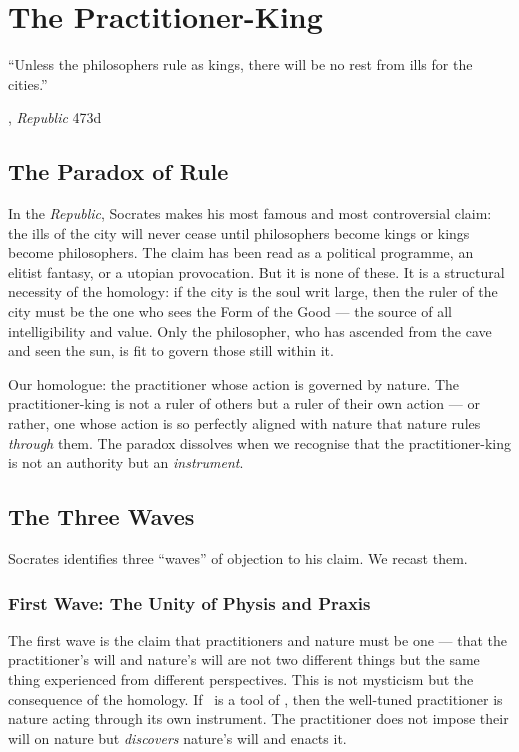 \chapter{The Practitioner-King}

\epigraph{``Unless the philosophers rule as kings, there will be no rest from ills
for the cities.''}{\textcite{plato1997complete}, \emph{Republic} 473d}

\section{The Paradox of Rule}

In the \emph{Republic}, Socrates makes his most famous and most controversial
claim: the ills of the city will never cease until philosophers become kings or
kings become philosophers. The claim has been read as a political programme, an
elitist fantasy, or a utopian provocation. But it is none of these. It is a
structural necessity of the homology: if the city is the soul writ large, then
the ruler of the city must be the one who sees the Form of the Good --- the
source of all intelligibility and value. Only the philosopher, who has ascended
from the cave and seen the sun, is fit to govern those still within it.

Our homologue: the practitioner whose action is governed by nature. The
practitioner-king is not a ruler of others but a ruler of their own action ---
or rather, one whose action is so perfectly aligned with nature that nature rules
\emph{through} them. The paradox dissolves when we recognise that the
practitioner-king is not an authority but an \emph{instrument}.

\section{The Three Waves}

Socrates identifies three ``waves'' of objection to his claim. We recast them.

\subsection{First Wave: The Unity of Physis and Praxis}

The first wave is the claim that practitioners and nature must be one --- that
the practitioner's will and nature's will are not two different things but the
same thing experienced from different perspectives. This is not mysticism but
the consequence of the homology. If \praxis\ is a tool of \physis, then the
well-tuned practitioner is nature acting through its own instrument. The
practitioner does not impose their will on nature but \emph{discovers} nature's
will and enacts it.

